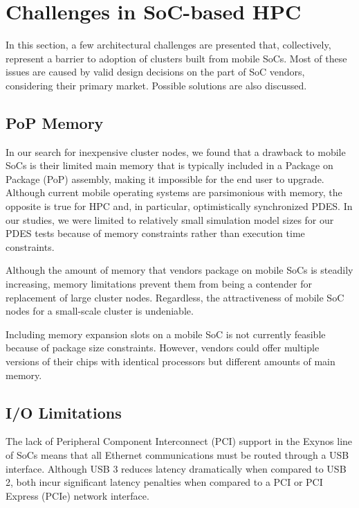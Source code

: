 \documentclass[11pt]{book}
\begin{document}
\section{Challenges in SoC-based HPC}

In this section, a few architectural challenges are presented that, collectively,
represent a barrier to adoption of clusters built from mobile SoCs.  Most of these issues
are caused by valid design decisions on the part of SoC vendors, considering their primary
market.  Possible solutions are also discussed.

\subsection{PoP Memory}

In our search for inexpensive cluster nodes, we found that a drawback to mobile SoCs is
their limited main memory that is typically included in a Package on Package (PoP)
assembly, making it impossible for the end user to upgrade.  Although current mobile
operating systems are parsimonious with memory, the opposite is true for HPC and, in
particular, optimistically synchronized PDES.  In our studies, we were limited to
relatively small simulation model sizes for our PDES tests because of memory constraints
rather than execution time constraints.

Although the amount of memory that vendors package on mobile SoCs is steadily increasing,
memory limitations prevent them from being a contender for replacement of large cluster
nodes.  Regardless, the attractiveness of mobile SoC nodes for a small-scale cluster is
undeniable.

Including memory expansion slots on a mobile SoC is not currently feasible because of
package size constraints.  However, vendors could offer multiple versions of their chips
with identical processors but different amounts of main memory.

\subsection{I/O Limitations}

The lack of Peripheral Component Interconnect (PCI) support in the Exynos line of SoCs
means that all Ethernet communications must be routed through a USB interface.  Although
USB 3 reduces latency dramatically when compared to USB 2, both incur significant latency
penalties when compared to a PCI or PCI Express (PCIe) network interface.
\end{document}
